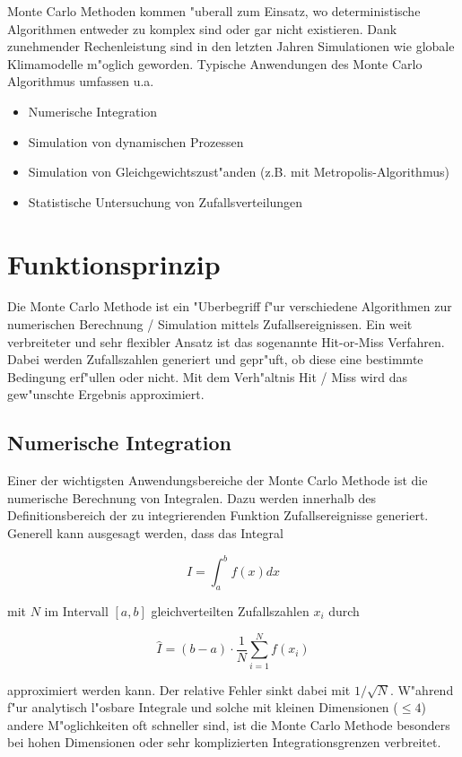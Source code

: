 \begin{refsection}
Monte Carlo Methoden kommen "uberall zum Einsatz, wo deterministische
Algorithmen entweder zu komplex sind oder gar nicht existieren. Dank
zunehmender Rechenleistung sind in den letzten Jahren Simulationen wie
globale Klimamodelle m"oglich geworden. Typische Anwendungen des Monte
Carlo Algorithmus umfassen u.a.

\begin{itemize}
\item Numerische Integration
\item Simulation von dynamischen Prozessen
\item Simulation von Gleichgewichtszust"anden (z.B. mit Metropolis-Algorithmus)
\item Statistische Untersuchung von Zufallsverteilungen
\end{itemize}

\section{Funktionsprinzip}
Die Monte Carlo Methode ist ein "Uberbegriff f"ur verschiedene Algorithmen
zur numerischen Berechnung / Simulation mittels Zufallsereignissen. Ein
weit verbreiteter und sehr flexibler Ansatz ist das sogenannte Hit-or-Miss
Verfahren. Dabei werden Zufallszahlen generiert und gepr"uft, ob diese
eine bestimmte Bedingung erf"ullen oder nicht. Mit dem Verh"altnis Hit /
Miss wird das gew"unschte Ergebnis approximiert.

\subsection{Numerische Integration} \label{subsec:numIntegration}
Einer der wichtigsten Anwendungsbereiche der Monte Carlo Methode ist
die numerische Berechnung von Integralen. Dazu werden innerhalb des
Definitionsbereich der zu integrierenden Funktion Zufallsereignisse
generiert. Generell kann ausgesagt werden, dass das Integral

\begin{equation}
	I = \int_a^b f(x) dx
\end{equation} 

mit $N$ im Intervall $[a,b]$ gleichverteilten Zufallszahlen $x_i$ durch

\begin{equation}
	\hat{I} = (b-a) \cdot \frac{1}{N} \sum_{i=1}^{N} f(x_i)
\end{equation}

approximiert werden kann. Der relative Fehler sinkt dabei mit $1 /
\sqrt{N}$. W"ahrend f"ur analytisch l"osbare Integrale und solche mit
kleinen Dimensionen ($\leq 4$) andere M"oglichkeiten oft schneller sind,
ist die Monte Carlo Methode besonders bei hohen Dimensionen oder sehr
komplizierten Integrationsgrenzen verbreitet.


\end{refsection}
